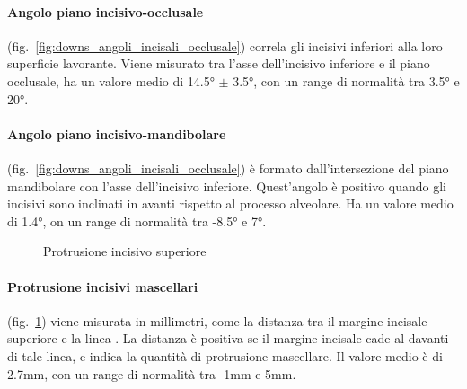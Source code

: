 \paragraph{Angolo piano incisivo-occlusale} (fig.~\ref{fig:downs_angoli_incisali_occlusale}) correla gli incisivi inferiori alla loro superficie lavorante. Viene misurato tra l'asse dell'incisivo inferiore e il piano occlusale, ha un valore medio di 14.5° $\pm$ 3.5°, con un range di normalità tra 3.5° e 20°.

\paragraph{Angolo piano incisivo-mandibolare} (fig.~\ref{fig:downs_angoli_incisali_occlusale}) è formato dall'intersezione del piano mandibolare con l'asse dell'incisivo inferiore. Quest'angolo è positivo quando gli incisivi sono inclinati in avanti rispetto al processo alveolare. Ha un valore medio di 1.4°, on un range di normalità tra -8.5° e 7°.

\begin{figure}
 \centering
 \caption{Protrusione incisivo superiore}
 \label{fig:downs_protrusione}
\end{figure}

\paragraph{Protrusione incisivi mascellari} (fig.~\ref{fig:downs_protrusione}) viene misurata in millimetri, come la distanza tra il margine incisale superiore e la linea . La distanza è positiva se il margine incisale cade al davanti di tale linea, e indica la quantità di protrusione mascellare. Il valore medio è di 2.7mm, con un range di normalità tra -1mm e 5mm.
